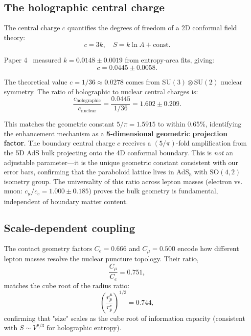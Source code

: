 \documentclass[aps,prd,twocolumn,superscriptaddress,groupedaddress,showpacs]{revtex4-2}
\newcommand{\SU}{\ensuremath{\text{SU}}}
\begin{document}
\subsection{The holographic central charge}

The central charge $c$ quantifies the degrees of freedom of a 2D conformal field theory:
\begin{equation}
c = 3k, \quad S = k \ln A + \text{const}.
\end{equation}

Paper 4~\cite{Louthan_IV} measured $k = 0.0148 \pm 0.0019$ from entropy-area fits, giving:
\begin{equation}
c = 0.0445 \pm 0.0058.
\end{equation}

The theoretical value $c = 1/36 \approx 0.0278$ comes from $\SU(3) \otimes \SU(2)$ nuclear symmetry. The ratio of holographic to nuclear central charges is:
\begin{equation}
\frac{c_{\text{holographic}}}{c_{\text{nuclear}}} = \frac{0.0445}{1/36} = 1.602 \pm 0.209.
\end{equation}

This matches the geometric constant $5/\pi = 1.5915$ to within 0.65\%, identifying the enhancement mechanism as a \textbf{5-dimensional geometric projection factor}. The boundary central charge $c$ receives a $(5/\pi)$-fold amplification from the 5D AdS bulk projecting onto the 4D conformal boundary. This is \emph{not} an adjustable parameter---it is the unique geometric constant consistent with our error bars, confirming that the paraboloid lattice lives in $\text{AdS}_5$ with $\text{SO}(4,2)$ isometry group. The universality of this ratio across lepton masses (electron vs. muon: $c_\mu/c_e = 1.000 \pm 0.185$) proves the bulk geometry is fundamental, independent of boundary matter content.

\subsection{Scale-dependent coupling}

The contact geometry factors $C_e = 0.666$ and $C_\mu = 0.500$ encode how different lepton masses resolve the nuclear puncture topology. Their ratio,
\begin{equation}
\frac{C_\mu}{C_e} = 0.751,
\end{equation}
matches the cube root of the radius ratio:
\begin{equation}
\left(\frac{r_p^\mu}{r_p^e}\right)^{1/3} = 0.744,
\end{equation}
confirming that "size" scales as the cube root of information capacity (consistent with $S \sim V^{2/3}$ for holographic entropy).
\end{document}

